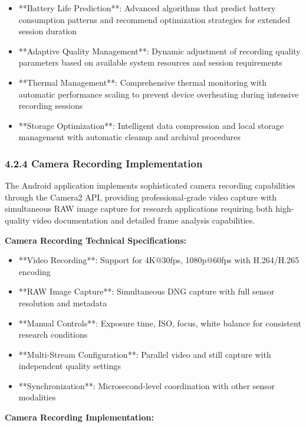 \documentclass[12pt,a4paper]{article}
\begin{document}
\begin{itemize}
\item **Battery Life Prediction**: Advanced algorithms that predict battery consumption patterns and recommend optimization
  strategies for extended session duration
\item **Adaptive Quality Management**: Dynamic adjustment of recording quality parameters based on available system
  resources and session requirements
\item **Thermal Management**: Comprehensive thermal monitoring with automatic performance scaling to prevent device
  overheating during intensive recording sessions
\item **Storage Optimization**: Intelligent data compression and local storage management with automatic cleanup and
  archival procedures

\end{itemize}
\subsubsection{4.2.4 Camera Recording Implementation}

The Android application implements sophisticated camera recording capabilities through the Camera2 API, providing
professional-grade video capture with simultaneous RAW image capture for research applications requiring both
high-quality video documentation and detailed frame analysis capabilities.

\textbf{Camera Recording Technical Specifications:}

\begin{itemize}
\item **Video Recording**: Support for 4K@30fps, 1080p@60fps with H.264/H.265 encoding
\item **RAW Image Capture**: Simultaneous DNG capture with full sensor resolution and metadata
\item **Manual Controls**: Exposure time, ISO, focus, white balance for consistent research conditions
\item **Multi-Stream Configuration**: Parallel video and still capture with independent quality settings
\item **Synchronization**: Microsecond-level coordination with other sensor modalities

\end{itemize}
\textbf{Camera Recording Implementation:}
\end{document}
